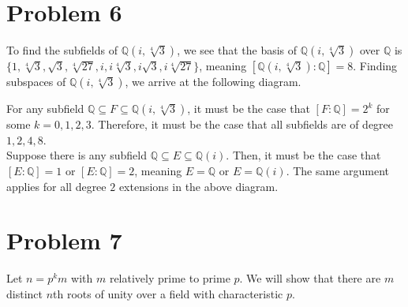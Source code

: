 \documentclass[11pt]{extarticle}
\newcommand{\Q}{\mathbb{Q}}
\begin{document}
  \section{Problem 6}%
  To find the subfields of $\Q(i,\sqrt[4]{3})$, we see that the basis of $\Q(i,\sqrt[4]{3})$ over $\Q$ is $\{1,\sqrt[4]{3},\sqrt{3},\sqrt[4]{27},i,i\sqrt[4]{3},i\sqrt{3},i\sqrt[4]{27}\}$, meaning $[\Q(i,\sqrt[4]{3}):\Q] = 8$. Finding subspaces of $\Q(i,\sqrt[4]{3})$, we arrive at the following diagram.
  \begin{center}
  \end{center}
  For any subfield $\Q\subseteq F \subseteq \Q(i,\sqrt[4]{3})$, it must be the case that $[F:\Q] = 2^k$ for some $k = 0,1,2,3$. Therefore, it must be the case that all subfields are of degree $1,2,4,8$.\\

  Suppose there is any subfield $\Q\subseteq E\subseteq \Q(i)$. Then, it must be the case that $[E:\Q] = 1$ or $[E:\Q] = 2$, meaning $E = \Q$ or $E = \Q(i)$. The same argument applies for all degree $2$ extensions in the above diagram. 
  \section{Problem 7}%
  Let $n= p^k m$ with $m$ relatively prime to prime $p$. We will show that there are $m$ distinct $n$th roots of unity over a field with characteristic $p$.\\
\end{document}
